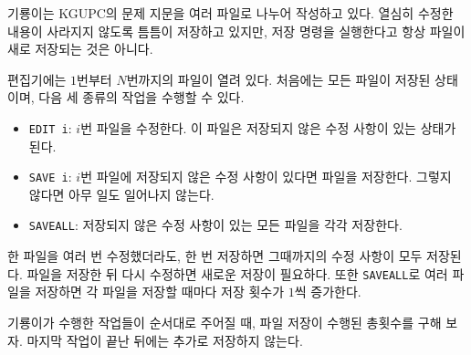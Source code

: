 기룡이는 KGUPC의 문제 지문을 여러 파일로 나누어 작성하고 있다. 열심히 수정한 내용이 사라지지 않도록 틈틈이 저장하고 있지만, 저장 명령을 실행한다고 항상 파일이 새로 저장되는 것은 아니다.

편집기에는 $1$번부터 $N$번까지의 파일이 열려 있다. 처음에는 모든 파일이 저장된 상태이며, 다음 세 종류의 작업을 수행할 수 있다.

\begin{itemize}
\item \texttt{EDIT i}: $i$번 파일을 수정한다. 이 파일은 저장되지 않은 수정 사항이 있는 상태가 된다.
\item \texttt{SAVE i}: $i$번 파일에 저장되지 않은 수정 사항이 있다면 파일을 저장한다. 그렇지 않다면 아무 일도 일어나지 않는다.
\item \texttt{SAVEALL}: 저장되지 않은 수정 사항이 있는 모든 파일을 각각 저장한다.
\end{itemize}

한 파일을 여러 번 수정했더라도, 한 번 저장하면 그때까지의 수정 사항이 모두 저장된다. 파일을 저장한 뒤 다시 수정하면 새로운 저장이 필요하다. 또한 \texttt{SAVEALL}로 여러 파일을 저장하면 각 파일을 저장할 때마다 저장 횟수가 $1$씩 증가한다.

기룡이가 수행한 작업들이 순서대로 주어질 때, 파일 저장이 수행된 총횟수를 구해 보자. 마지막 작업이 끝난 뒤에는 추가로 저장하지 않는다.